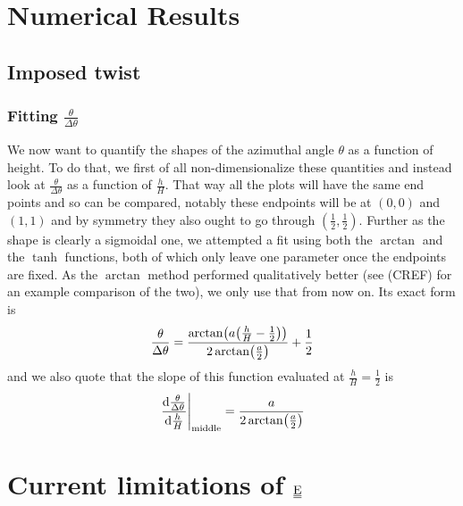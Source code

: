 \documentclass[12pt]{article}
\newcommand\barbelow[1]{\stackunder[1.2pt]{#1}{\rule{1.5ex}{.1ex}}}
\newcommand{\du}[1]{\barbelow{\barbelow{#1}}}
\newcommand{\EE}{$\du{E}$}
\begin{document}
\section{Numerical Results}
\subsection{Imposed twist}
\subsubsection{Fitting $\frac{\theta}{\Delta\theta}$}
We now want to quantify the shapes of the azimuthal angle $\theta$ as a function of height.
To do that, we first of all non-dimensionalize these quantities and instead look at $\frac{\theta}{\Delta\theta}$ as a function of $\frac{h}{H}$.
That way all the plots will have the same end points and so can be compared, notably these endpoints will be at $(0, 0)$ and $(1, 1)$ and by symmetry they also ought to go through $(\frac{1}{2}, \frac{1}{2})$.
Further as the shape is clearly a sigmoidal one, we attempted a fit using both the $\arctan$ and the $\tanh$ functions, both of which only leave one parameter once the endpoints are fixed.
As the $\arctan$ method performed qualitatively better (see (CREF) for an example comparison of the two), we only use that from now on.
Its exact form is
\begin{equation}
    \frac{\theta}{\Delta\theta} = \frac{\arctan(a \qty(\frac{h}{H} - \frac{1}{2}))}{2\arctan(\frac{a}{2})} + \frac{1}{2}
\end{equation}
and we also quote that the slope of this function evaluated at $\frac{h}{H} = \frac{1}{2}$ is
\begin{equation}
    \eval{\dv{\frac{\theta}{\Delta\theta}}{\frac{h}{H}}}_\text{middle} = \frac{a}{2\arctan(\frac{a}{2})}
\end{equation}

\section{Current limitations of \EE}
\end{document}
